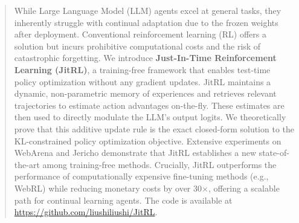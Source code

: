 \documentclass{article}
\theoremstyle{plain}
\theoremstyle{definition}
\theoremstyle{remark}
\begin{document}
\begin{abstract}
While Large Language Model (LLM) agents excel at general tasks, they inherently struggle with continual adaptation due to the frozen weights after deployment. Conventional reinforcement learning (RL) offers a solution but incurs prohibitive computational costs and the risk of catastrophic forgetting. 
    We introduce \textbf{Just-In-Time Reinforcement Learning (JitRL)}, a training-free framework that enables test-time policy optimization without any gradient updates. 
    JitRL maintains a dynamic, non-parametric memory of experiences and retrieves relevant trajectories to estimate action advantages on-the-fly. 
    These estimates are then used to directly modulate the LLM's output logits. 
    We theoretically prove that this additive update rule is the exact closed-form solution to the KL-constrained policy optimization objective. 
    Extensive experiments on WebArena and Jericho demonstrate that JitRL establishes a new state-of-the-art among training-free methods. 
    Crucially, JitRL outperforms the performance of computationally expensive fine-tuning methods (e.g., WebRL) while reducing monetary costs by over 30$\times$, offering a scalable path for continual learning agents. The code is available at \href{https://github.com/liushiliushi/JitRL}{https://github.com/liushiliushi/JitRL}.
\end{abstract}









% 


\end{document}
